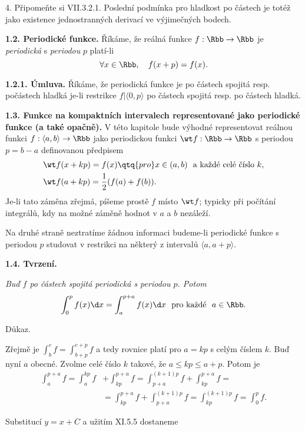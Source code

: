 \documentclass[12pt]{article}
\begin{document}
4. Připomeňte si VII.3.2.1. Poslední podmínka pro hladkost po částech je totéž jako existence jednostranných derivací ve výjimečných bodech.

\bigskip

{\bf 1.2. Periodické funkce.} Říkáme, že reálná funkce $f:\Rbb\to\Rbb$ je {\em periodická} s {\em periodou} $p$ platí-li
$$
\forall x\in\Rbb, \quad f(x+p)=f(x).
$$

\medskip

{\bf 1.2.1. Úmluva.} Říkáme, že periodická funkce je po částech spojitá resp. počástech hladká
je-li restrikce $f|\langle 0,p\rangle$ po částech spojitá resp. po částech hladká.


\bigskip

{\bf 1.3. Funkce na kompaktních intervalech representované jako periodické funkce (a také  opačně).} V této kapitole bude výhodné representovat reálnou funkci
 $f:\langle a,b\rangle\to\Rbb$ jako periodickou funkci $\wt f:\Rbb\to\Rbb$ s periodou $p=b-a$ definovanou předpisem
$$
\begin{aligned}
&\wt f(x+kp)=f(x) \qtq{pro} x\in (a,b) \ \ \text{a každé celé číslo} \ k,\\
&\wt f(a+kp)= \frac12(f(a)+f(b)).
\end{aligned}
$$
Je-li tato záměna zřejmá, píšeme prostě  $f$ místo $\wt f$;  typicky při počítání integrálů, kdy na možné záměně hodnot
v $a$ a $b$ nezáleží.

Na druhé straně neztratíme žádnou informaci budeme-li periodické funkce  s periodou $p$ studovat v restrikci na některý z intervalů $\langle a, a+p\rangle$.


\bigskip

{\bf 1.4. Tvrzení.} {\em Buď $f$ po částech spojitá periodická s periodou $p$. Potom
$$
\int_0^p f(x)\d x=\int_a^{p+a} f(x)\d x\ \ \text{pro každé} \ \ a\in\Rbb.
$$

Důkaz.} Zřejmě je $\int_b^{c}f=\int_{b+p}^{c+p}f$ a tedy rovnice platí pro $a=kp$ s celým číslem $k$. Buď nyní
$a$ obecné. Zvolme celé číslo $k$ takové, že $a\leq kp\leq a+p$. Potom je
$$
\begin{aligned}
\int_{a}^{p+a}f=\int_{a}^{kp}f&+\int_{kp}^{p+a}f=
\int_{p+a}^{(k+1)p}f+\int_{kp}^{p+a}f=\\
&=\int_{kp}^{p+a}f+\int_{p+a}^{(k+1)p}f=\int_{kp}^{(k+1)p}f=\int_{0}^{p}f.
\end{aligned}
$$
\sq

\medskip

 Substitucí $y=x+C$ a užitím XI.5.5 dostaneme
\end{document}
